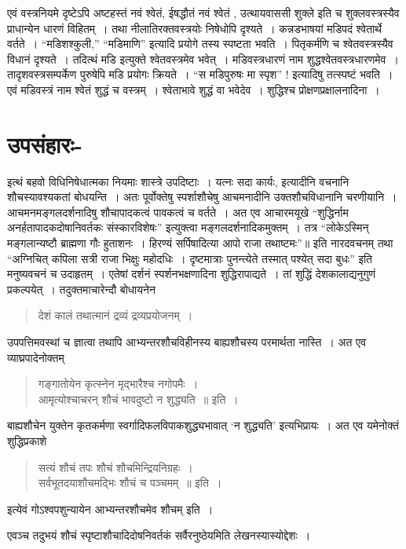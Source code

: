 {एवं वस्त्रनियमे दृष्टेऽपि अष्टहस्तं नवं श्वेतं, ईषद्धौतं नवं श्वेतं , उत्थायवाससी शुक्ले इति च शुक्लवस्त्रस्यैव प्राधान्येन धारणं विहितम्~। तथा नीलातिरक्तवस्त्रयोः निषेधोपि दृश्यते~। कन्नडभाषयां मडिपदं श्वेतार्थे वर्तते~। “मडिशश्कुली,” “मडिमाणि” इत्यादि प्रयोगे तस्य स्पष्टता भवति~। पितृकर्मणि च श्वेतवस्त्रस्यैव विधानं दृश्यते~। तदित्थं मडि इत्युक्ते श्वेतवस्त्रमेव भवेत्~। मडिवस्त्रधारणं नाम शुद्धश्वेतवस्त्रधारणमेव~। तादृशवस्त्रसम्पर्केण पुरुषेपि मडि प्रयोगः क्रियते~। “स मडिपुरुषः मा स्पृश” ! इत्यादिषु तत्स्पष्टं भवति~। एवं मडिवस्त्रं नाम श्वेतं शुद्धं च वस्त्रम्~। श्वेताभावे शुद्धं वा भवेदेव~। शुद्धिश्च प्रोक्षणप्रक्षालनादिना~। 

\section*{उपसंहारः-} 

इत्थं बहवो विधिनिषेधात्मका नियमाः शास्त्रे उपदिष्टाः~। यत्नः सदा कार्यः, इत्यादीनि वचनानि शौचस्यावश्यकतां बोधयन्ति~। अतः पूर्वोक्तेषु स्पर्शाशौचेषु आचमनादीनि उक्तशौचविधानानि चरणीयानि~। आचमनमङ्गलदर्शनादिषु शौचापादकत्वं पावकत्वं च वर्तते~। अत एव आचारमयूखे “शुद्धिर्नाम अनर्हतापादकदोषानिवर्तकः संस्कारविशेषः” इत्युक्त्वा मङ्गलदर्शनादिकमुक्तम्~। तत्र “लोकेऽस्मिन् मङ्गलान्यष्टौ ब्राह्मणा गौः हुताशनः~। हिरण्यं सर्पिषादित्या आपो राजा तथाष्टमः”॥ इति नारदवचनम् तथा “अग्निचित् कपिला सत्री राजा भिक्षुः महोदधिः~। दृष्टमात्राः पुनन्त्येते तस्मात् पश्येत् सदा बुधः” इति मनुष्यवचनं च उदाहृतम्~। एतेषां दर्शनं स्पर्शनभक्षणादिना शुद्धिरापाद्यते~। तां शुद्धिं देशकालाद्यनुगुणं प्रकल्पयेत्~। तदुक्तमाचारेन्दौ बोधायनेन 
\begin{verse}
देशं कालं तथात्मानं द्रव्यं द्रव्यप्रयोजनम्~। 
\end{verse}
उपपत्तिमवस्थां च ज्ञात्वा तथापि आभ्यन्तरशौचविहीनस्य बाह्यशौचस्य परमार्थता नास्ति~। अत एव व्याघ्रपादेनोक्तम् 
\begin{verse}
गङ्गातोयेन कृत्स्नेन मृद्भारैश्च नगोपमैः~। \\
आमृत्योश्चाचरन् शौचं भावदुष्टो न शुद्ध्यति~॥ इति~। 
\end{verse}
बाह्यशौचेन युक्तेन कृतकर्मणा स्वर्गादिफलविपाकशुद्ध्यभावात् ‘न शुद्ध्यति’ इत्यभिप्रायः~। अत एव यमेनोक्तं शुद्धिप्रकाशे 
\begin{verse}
सत्यं शौचं तपः शौचं शौचमिन्द्रियनिग्रहः~। \\
सर्वभूतदयाशौचमद्भिः शौचं च पञ्चमम्~॥ इति~। 
\end{verse}
इत्येवं गोऽश्वपशुन्यायेन आभ्यन्तरशौचमेव शौचम् इति~। 

एवञ्च तदुभयं शौचं स्पृष्टाशौचादिदोषनिवर्तकं सर्वैरनुष्ठेयमिति लेखनस्यास्योद्देशः~। 

\articleend
}
